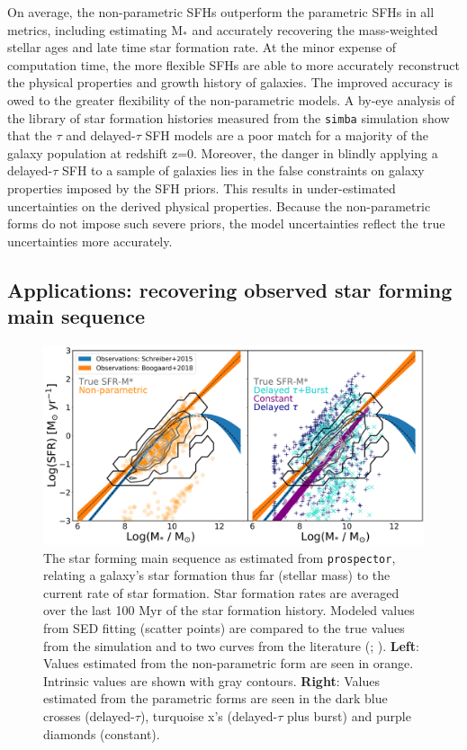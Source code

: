 \documentclass[twocolumn]{aastex62}
\begin{document}
On average, the non-parametric SFHs outperform the parametric SFHs in all metrics, including estimating M$_*$ and accurately recovering the mass-weighted stellar ages and late time star formation rate. At the minor expense of computation time, the more flexible SFHs are able to more accurately reconstruct the physical properties and growth history of galaxies. The improved accuracy is owed to the greater flexibility of the non-parametric models. A by-eye analysis of the library of star formation histories measured from the \texttt{simba} simulation show that the $\tau$ and delayed-$\tau$ SFH models are a poor match for a majority of the galaxy population at redshift z=0. Moreover, the danger in blindly applying a delayed-$\tau$ SFH to a sample of galaxies lies in the false constraints on galaxy properties imposed by the SFH priors. This results in under-estimated uncertainties on the derived physical properties. Because the non-parametric forms do not impose such severe priors, the model uncertainties reflect the true uncertainties more accurately. 


\subsection{Applications: recovering observed star forming main sequence}\label{section:MS}

\begin{figure}[t]

\centering
\includegraphics[width=\textwidth]{MS_twopanel.png}\hfill

\caption{The star forming main sequence as estimated from \texttt{prospector}, relating a galaxy's star formation thus far (stellar mass) to the current rate of star formation. Star formation rates are averaged over the last 100 Myr of the star formation history. Modeled values from SED fitting (scatter points) are compared to the true values from the simulation and to two curves from the literature (\cite{schreiber_herschel_2015}; \cite{boogaard_muse_2018}). \textbf{Left}: Values estimated from the non-parametric form are seen in orange. Intrinsic values are shown with gray contours. \textbf{Right}: Values estimated from the parametric forms are seen in the dark blue crosses (delayed-$\tau$), turquoise x's (delayed-$\tau$ plus burst) and purple diamonds (constant).}
\label{fig:sfms}
\end{figure}
\end{document}
